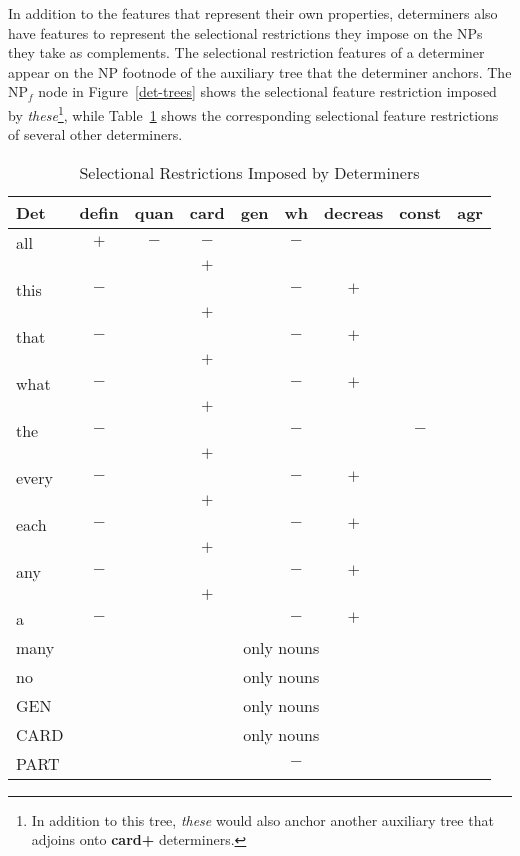 \normalsize

In addition to the features that represent their own properties, determiners
also have features to represent the selectional
restrictions they impose on the NPs they take as complements.  The
selectional restriction features of a determiner appear on the NP footnode of
the auxiliary tree that the determiner anchors.  The NP$_{f}$ node in Figure~\ref{det-trees} shows the selectional feature
restriction imposed by {\it these}\footnote{In addition to this tree, {\it
these} would also anchor another auxiliary tree that adjoins onto {\bf card+}
determiners.}, while Table~\ref{det-ordering} shows the corresponding
selectional feature restrictions of several other determiners.

\tiny
\begin{table}
\centering
\begin{tabular}{|l||c|c|c|c|c|c|c|c|}
\hline
Det&defin&quan&card&gen&wh&decreas&const&agr\\
\hline
\hline
all&$+$&$-$&$-$&&$-$&&&\\
&&&$+$&&&&&\\
this&$-$&&&&$-$&$+$&&\\
&&&$+$&&&&&\\
that&$-$&&&&$-$&$+$&&\\
&&&$+$&&&&&\\
what&$-$&&&&$-$&$+$&&\\
&&&$+$&&&&&\\
the&$-$&&&&$-$&&$-$&\\
&&&$+$&&&&&\\
every&$-$&&&&$-$&$+$&&\\
&&&$+$&&&&&\\
each&$-$&&&&$-$&$+$&&\\
&&&$+$&&&&&\\
any&$-$&&&&$-$&$+$&&\\
&&&$+$&&&&&\\
a&$-$&&&&$-$&$+$&&\\
many&\multicolumn{8}{c|}{only nouns}\\
no&\multicolumn{8}{c|}{only nouns}\\
GEN&\multicolumn{8}{c|}{only nouns}\\
CARD&\multicolumn{8}{c|}{only nouns}\\
PART&&&&&$-$&&&\\
\hline
\end{tabular}
\caption{Selectional Restrictions Imposed by Determiners}
\label{det-ordering}
\end{table}

